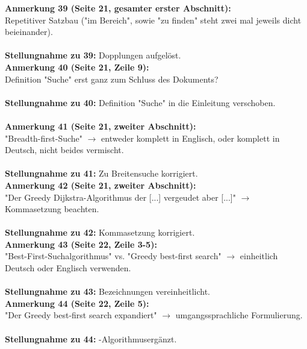 \documentclass[a4paper,12pt]{book}
\begin{document}
\noindent
\textbf{Anmerkung 39 (Seite 21, gesamter erster Abschnitt):}\\
Repetitiver Satzbau ("im Bereich", sowie "zu finden" steht zwei mal jeweils dicht beieinander). \\
\\
\textbf{Stellungnahme zu 39:}
Dopplungen aufgelöst.
\\

\noindent
\textbf{Anmerkung 40 (Seite 21, Zeile 9):}\\
Definition "Suche" erst ganz zum Schluss des Dokuments? 
\\ \\
\textbf{Stellungnahme zu 40:}
Definition  "Suche" in die Einleitung verschoben.
\\ \\

\noindent
\textbf{Anmerkung 41 (Seite 21, zweiter Abschnitt):}\\
"Breadth-first-Suche" $\rightarrow$ entweder komplett in Englisch, oder komplett in Deutsch, nicht beides vermischt. \\
\\
\textbf{Stellungnahme zu 41:}
Zu \glqq Breitensuche \grqq korrigiert.
\\

\noindent
\textbf{Anmerkung 42 (Seite 21, zweiter Abschnitt):}\\
"Der Greedy Dijkstra-Algorithmus der [...] vergeudet aber [...]" $\rightarrow$ Kommasetzung beachten. \\
\\
\textbf{Stellungnahme zu 42:}
Kommasetzung korrigiert.
\\

\noindent
\textbf{Anmerkung 43 (Seite 22, Zeile 3-5):}\\
"Best-First-Suchalgorithmus" vs. "Greedy best-first search" $\rightarrow$ einheitlich Deutsch oder Englisch verwenden. \\
\\
\textbf{Stellungnahme zu 43:}
Bezeichnungen vereinheitlicht.
\\

\noindent
\textbf{Anmerkung 44 (Seite 22, Zeile 5):}\\
"Der Greedy best-first search expandiert" $\rightarrow$ umgangssprachliche Formulierung. \\
\\
\textbf{Stellungnahme zu 44:}
\glqq-Algorithmus\grqq ergänzt.
\\
\end{document}

